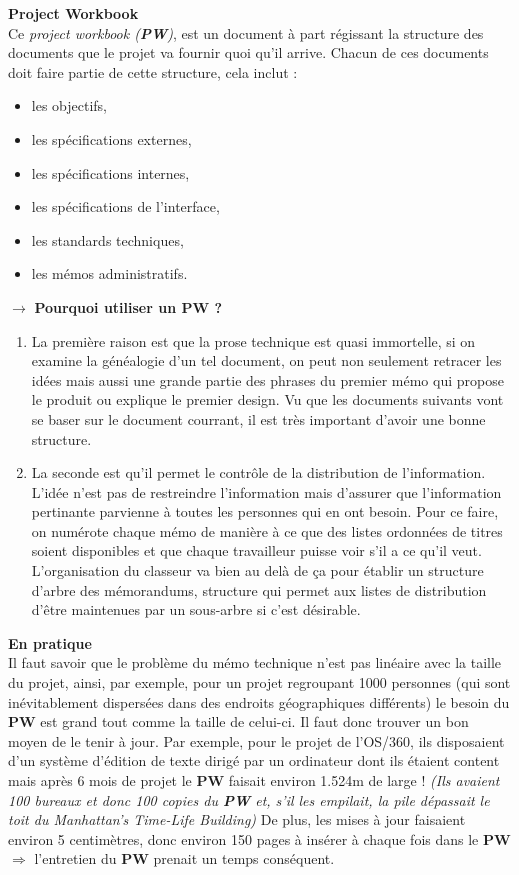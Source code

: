 \documentclass[runningheads]{llncs}
\begin{document}
\noindent\textbf{Project Workbook}\\
Ce \textit{project workbook (\textbf{PW})}, est un document à part régissant la structure des documents que le projet va fournir
quoi qu'il arrive. Chacun de ces documents doit faire partie de cette structure, cela inclut :
\begin{itemize}
\item les objectifs,
\item les spécifications externes,
\item les spécifications internes,
\item les spécifications de l'interface,
\item les standards techniques,
\item les mémos administratifs.
\end{itemize}
\noindent $\rightarrow$ \textbf{Pourquoi utiliser un PW ?}
\begin{enumerate}
\item La première raison est que la prose technique est quasi immortelle, si on examine la généalogie d'un tel document, on peut
non seulement retracer les idées mais aussi une grande partie des phrases du premier mémo qui propose le produit ou explique le
premier design. Vu que les documents suivants vont se baser sur le document courrant, il est très important d'avoir une bonne
structure.
\item La seconde est qu'il permet le contrôle de la distribution de l'information. L'idée n'est pas de restreindre l'information
mais d'assurer que l'information pertinante parvienne à toutes les personnes qui en ont besoin. Pour ce faire, on numérote chaque
mémo de manière à ce que des listes ordonnées de titres soient disponibles et que chaque travailleur puisse voir s'il a ce qu'il 
veut. L'organisation du classeur va bien au delà de ça pour établir un structure d'arbre des mémorandums, structure qui permet aux 
listes de distribution d'être maintenues par un sous-arbre si c'est désirable. \\
\end{enumerate}

\noindent\textbf{En pratique}\\
Il faut savoir que le problème du mémo technique n'est pas linéaire avec la taille du projet, ainsi, par exemple, pour un projet
regroupant 1000 personnes (qui sont inévitablement dispersées dans des endroits géographiques différents) le besoin du \textbf{PW}
est grand tout comme la taille de celui-ci. Il faut donc trouver un bon moyen de le tenir à jour. Par exemple, pour le projet de
l'OS/360, ils disposaient d'un système d'édition de texte dirigé par un ordinateur dont ils étaient content mais après 6 mois de 
projet le \textbf{PW} faisait environ 1.524m de large ! \textit{(Ils avaient 100 bureaux et donc 100 copies du \textbf{PW} et, 
s'il les empilait, la pile dépassait le toit du Manhattan's Time-Life Building)} De plus, les mises à jour faisaient environ 5 
centimètres, donc environ 150 pages à insérer à chaque fois dans le \textbf{PW} $\Rightarrow$ l'entretien du \textbf{PW} prenait
un temps conséquent.
\end{document}
